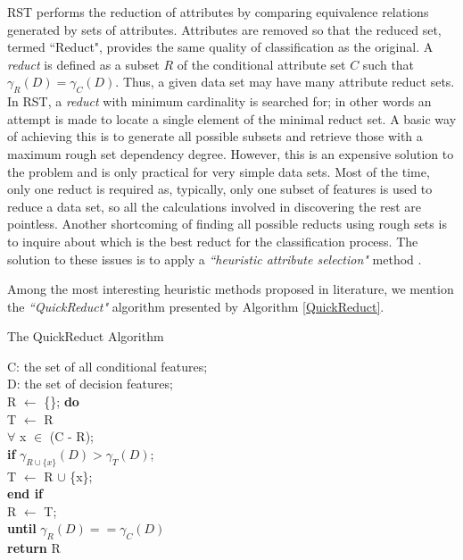 \documentclass{llncs}
\begin{document}
RST performs the reduction of attributes by comparing equivalence relations generated by sets of attributes. Attributes are removed so that the reduced set, termed ``Reduct", provides the same quality of classification as the original. A \emph{reduct} is defined as a subset $R$ of the conditional attribute set $C$ such that $\gamma_{R}(D) = \gamma_{C}(D)$. Thus, a given data set may have many attribute reduct sets. In RST, a \emph{reduct} with minimum cardinality is searched for; in other words an attempt is made to locate a single element of the minimal reduct set. A basic way of achieving this is to generate all possible subsets and retrieve those with a maximum rough set dependency degree. However, this is an expensive solution to the problem and is only practical for very simple data sets. Most of the time, only one reduct is required as, typically, only one subset of features is used to reduce a data set, so all the calculations involved in discovering the rest are pointless. Another shortcoming of finding all possible reducts using rough sets is to inquire about which is the best reduct for the classification process.  The solution to these issues is to apply a \emph{``heuristic attribute selection"} method \cite{zhong2001using}.

Among the most interesting heuristic methods proposed in literature, we mention the \emph{``QuickReduct"} algorithm \cite{shen2007rough} presented by Algorithm \ref{QuickReduct}.

\begin{algorithm}[!ht]
\caption{The QuickReduct Algorithm} \label{QuickReduct}
\begin{algorithmic}[1]
\STATE C: the set of all conditional features;\\
\STATE D: the set of decision features;\\
\STATE R $\leftarrow$ \{\};
\STATE \textbf{do} \\
\STATE \hspace{0.24cm} T $\leftarrow$ R\\
 \STATE \hspace{0.24cm} $\forall$ x $\in$ (C - R);\\
 \STATE \hspace{0.28cm} \textbf{if} $\gamma_{R \cup \{x\}}(D) > \gamma_T(D)$;\\
  \STATE \hspace{0.35cm} T $\leftarrow$ R $\cup$ \{x\};\\
  \STATE \hspace{0.28cm} \textbf{end if} \\
  \STATE \hspace{0.24cm} R $\leftarrow$ T;\\
  \STATE \textbf{until} $\gamma_R(D) == \gamma_C(D)$\\
  \STATE \textbf{return} R
\end{algorithmic}
\end{algorithm}
\end{document}
